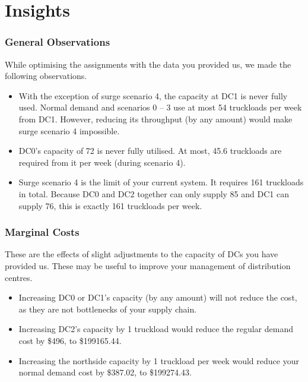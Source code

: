 \documentclass[11pt,a4paper]{article}
\begin{document}
\part{Insights}
\section{General Observations}
While optimising the assignments with the data you provided us, we made 
the following observations.
\begin{itemize}
    \item With the exception of surge scenario 4, the capacity at DC1 is never 
fully used. Normal demand and scenarios 0 -- 3 use at most 54 truckloads per week 
from DC1. However, reducing its throughput (by any amount) would make surge scenario 4
impossible.
    \item DC0's capacity of 72 is never fully utilised. At most, 45.6 truckloads are 
    required from it per week (during scenario 4).
    \item Surge scenario 4 is the limit of your current system. It requires 161 truckloads 
    in total. Because DC0 and DC2 together can only supply 85 and DC1 can supply 76, this is 
    exactly 161 truckloads per week. 
\end{itemize}

\section{Marginal Costs}
These are the effects of slight adjustments to the capacity of DCs 
 you have provided us. These may be useful to improve your management of 
 distribution centres. 
\begin{itemize}
    \item Increasing DC0 or DC1's capacity 
    (by any amount) will not reduce the cost, as they are not bottlenecks of your supply chain.
    \item Increasing DC2's capacity by 1 truckload would 
    reduce the regular demand cost by \$496, to \$199165.44.
    \item Increasing the northside capacity by 1 truckload per week would reduce your
    normal demand cost by \$387.02, to \$199274.43.
\end{itemize}
\end{document}

